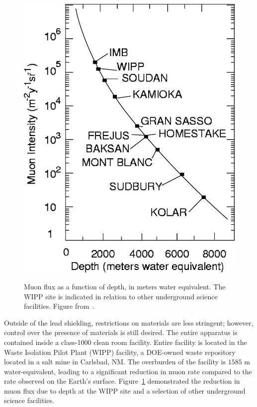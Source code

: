 \begin{figure}
\begin{center}
\includegraphics[keepaspectratio=true,width=\textwidth]{muonflux.eps}
\end{center}
\renewcommand{\baselinestretch}{1}
\small\normalsize
\begin{quote}
\caption{Muon flux as a function of depth, in meters water equivalent.  The WIPP site is indicated in relation to other underground science facilities.  Figure from~\cite{Esch2005516}.}
\label{fig:MuonFluxVsDepth}
\end{quote}
\end{figure}
\renewcommand{\baselinestretch}{2}
\small\normalsize

Outside of the lead shielding, restrictions on materials are less stringent; however, control over the presence of materials is still desired.  The entire apparatus is contained inside a class-1000 clean room facility.  Entire facility is located in the Waste Isolation Pilot Plant (WIPP) facility, a DOE-owned waste repository located in a salt mine in Carlsbad, NM.  The overburden of the facility is $1585$ m water-equivalent, leading to a significant reduction in muon rate compared to the rate observed on the Earth's surface.  Figure~\ref{fig:MuonFluxVsDepth} demonstrated the reduction in muon flux due to depth at the WIPP site and a selection of other underground science facilities.

